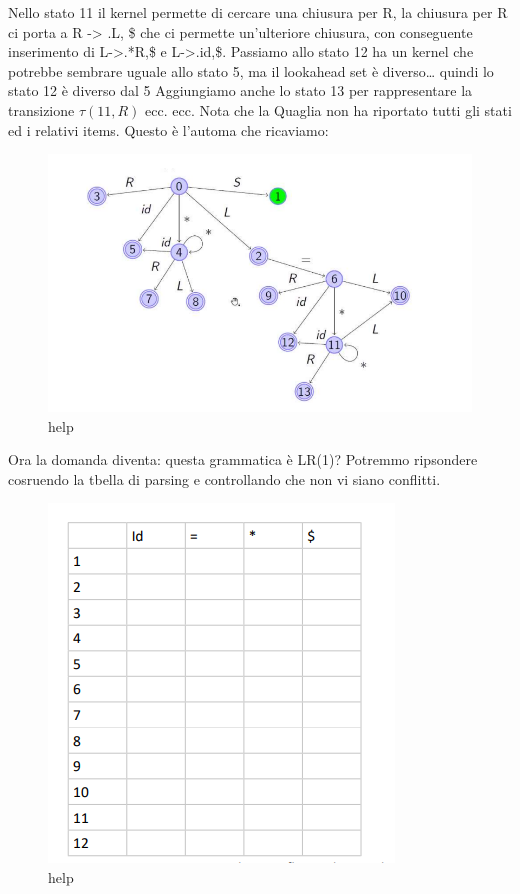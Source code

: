\documentclass[class=book, crop=false, oneside, 12pt]{standalone}
\begin{document}
Nello stato 11 il kernel permette di cercare una chiusura per R, la chiusura per R ci porta a R -> .L, {\$}
che ci permette un'ulteriore chiusura, con conseguente inserimento di L->.*R,{\$} e L->.id,{\$}.
Passiamo allo stato 12 ha un kernel che potrebbe sembrare uguale allo stato 5, ma il lookahead set è
diverso… quindi lo stato 12 è diverso dal 5
Aggiungiamo anche lo stato 13 per rappresentare la transizione \(\tau(11,R)\) ecc. ecc.
Nota che la Quaglia non ha riportato tutti gli stati ed i relativi items.
Questo è l'automa che ricaviamo:
\begin{figure}[H]
    \centering
    \includegraphics[width=.8\textwidth]{send_help_3.png}
    \caption{help}
\end{figure}
Ora la domanda diventa: questa grammatica è LR(1)?
Potremmo ripsondere cosruendo la tbella di parsing e controllando che non vi siano conflitti.
\begin{figure}[H]
    \centering
    \includegraphics[width=.8\textwidth]{send_help_4.png}
    \caption{help}
\end{figure}
\end{document}
